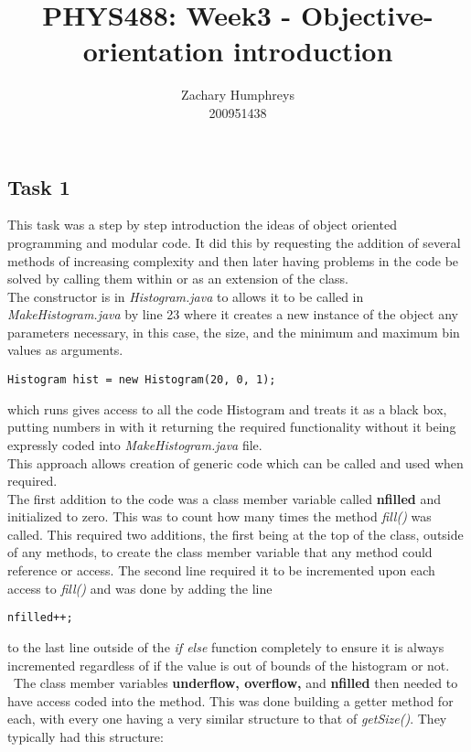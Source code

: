 \documentclass{article}
\title{PHYS488: Week3 - Objective-orientation introduction}
\author{Zachary Humphreys \\ 200951438}
\begin{document}
	\maketitle
	\begin{abstract}
		\begin{center}
		\textit{}
		\end{center}
	\end{abstract}
\begin{multicols}{2}
\section{Task 1}
	This task was a step by step introduction the ideas of object oriented programming and modular code. It did this by requesting the addition of several methods of increasing complexity and then later having problems in the code be solved by calling them within or as an extension of the class. \\ \indent The constructor is in \textit{Histogram.java} to allows it to be called in \textit{MakeHistogram.java} by line 23 where it creates a new instance of the object any parameters necessary, in this case, the size, and the minimum and maximum bin values as arguments.
	\begin{lstlisting}
Histogram hist = new Histogram(20, 0, 1);
	\end{lstlisting}
	which runs gives access to all the code Histogram and treats it as a black box, putting numbers in with it returning the required functionality without it being expressly coded into \textit{MakeHistogram.java} file. \\ \indent This approach allows creation of generic code which can be called and used when required. \\ \indent The first addition to the code was a class member variable called \textbf{nfilled} and initialized to zero. This was to count how many times the method \textit{fill()} was called. This required two additions, the first being at the top of the class, outside of any methods, to create the class member variable that any method could reference or access. The second line required it to be incremented upon each access to \textit{fill()} and was done by adding the line 
	\begin{lstlisting}
nfilled++;
	\end{lstlisting}
	to the last line outside of the \textit{if else} function completely to ensure it is always incremented regardless of if the value is out of bounds of the histogram or not. \\\ \indent The class member variables \textbf{underflow, overflow,} and \textbf{nfilled} then needed to have access coded into the method. This was done building a getter method for each, with every one having a very similar structure to that of \textit{getSize()}. They typically had this structure: 

\end{multicols}
\end{document}
